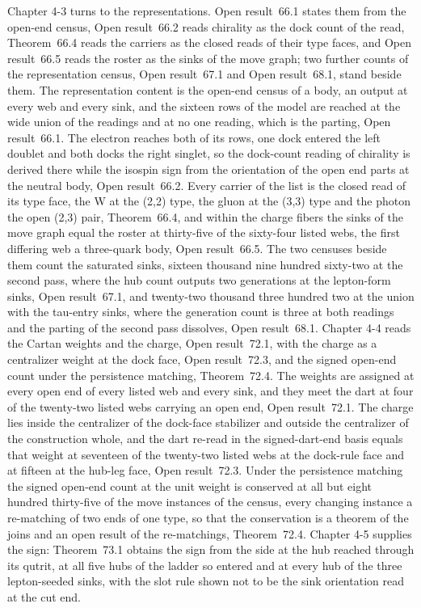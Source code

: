 Chapter 4-3 turns to the representations. Open result~66.1 states them from the open-end census, Open result~66.2 reads chirality as the dock count of the read, Theorem~66.4 reads the carriers as the closed reads of their type faces, and Open result~66.5 reads the roster as the sinks of the move graph; two further counts of the representation census, Open result~67.1 and Open result~68.1, stand beside them. The representation content is the open-end census of a body, an output at every web and every sink, and the sixteen rows of the model are reached at the wide union of the readings and at no one reading, which is the parting, Open result~66.1. The electron reaches both of its rows, one dock entered the left doublet and both docks the right singlet, so the dock-count reading of chirality is derived there while the isospin sign from the orientation of the open end parts at the neutral body, Open result~66.2. Every carrier of the list is the closed read of its type face, the W at the (2,2) type, the gluon at the (3,3) type and the photon the open (2,3) pair, Theorem~66.4, and within the charge fibers the sinks of the move graph equal the roster at thirty-five of the sixty-four listed webs, the first differing web a three-quark body, Open result~66.5. The two censuses beside them count the saturated sinks, sixteen thousand nine hundred sixty-two at the second pass, where the hub count outputs two generations at the lepton-form sinks, Open result~67.1, and twenty-two thousand three hundred two at the union with the tau-entry sinks, where the generation count is three at both readings and the parting of the second pass dissolves, Open result~68.1. Chapter 4-4 reads the Cartan weights and the charge, Open result~72.1, with the charge as a centralizer weight at the dock face, Open result~72.3, and the signed open-end count under the persistence matching, Theorem~72.4. The weights are assigned at every open end of every listed web and every sink, and they meet the dart at four of the twenty-two listed webs carrying an open end, Open result~72.1. The charge lies inside the centralizer of the dock-face stabilizer and outside the centralizer of the construction whole, and the dart re-read in the signed-dart-end basis equals that weight at seventeen of the twenty-two listed webs at the dock-rule face and at fifteen at the hub-leg face, Open result~72.3. Under the persistence matching the signed open-end count at the unit weight is conserved at all but eight hundred thirty-five of the move instances of the census, every changing instance a re-matching of two ends of one type, so that the conservation is a theorem of the joins and an open result of the re-matchings, Theorem~72.4. Chapter 4-5 supplies the sign: Theorem~73.1 obtains the sign from the side at the hub reached through its qutrit, at all five hubs of the ladder so entered and at every hub of the three lepton-seeded sinks, with the slot rule shown not to be the sink orientation read at the cut end.

